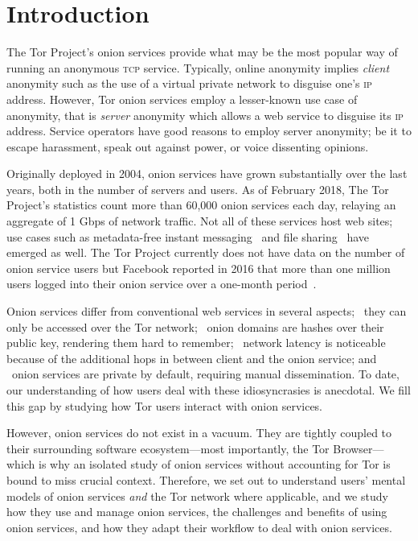 \section{Introduction}
\label{sec:introduction}
The Tor Project's onion services provide what may be the most popular way of
running an anonymous \textsc{tcp} service. Typically, online anonymity implies
\emph{client} anonymity such as the use of a virtual private network to disguise
one's \textsc{ip} address.  However, Tor onion services employ a lesser-known
use case of anonymity, that is \emph{server} anonymity which allows a web
service to disguise its \textsc{ip} address.  Service operators have good
reasons to employ server anonymity; be it to escape harassment, speak out
against power, or voice dissenting opinions.

Originally deployed in 2004, onion services have grown substantially over the
last years, both in the number of servers and users.  As of February 2018, The
Tor Project's statistics count more than 60,000 onion services each day,
relaying an aggregate of 1 Gbps of network traffic.  Not all of these services
host web sites; use cases such as metadata-free instant
messaging~\cite{ricochet} and file sharing~\cite{onionshare} have emerged as
well.  The Tor Project currently does not have data on the number of onion
service users but Facebook reported in 2016 that more than one million users
logged into their onion service over a one-month period~\cite{facebook-users}.

Onion services differ from conventional web services in several aspects;
\first~they can only be accessed over the Tor network; \second~onion domains are
hashes over their public key, rendering them hard to remember; \third~network
latency is noticeable because of the additional hops in between client and the
onion service; and \fourth~onion services are private by default, requiring
manual dissemination.  To date, our understanding of how users deal with these
idiosyncrasies is anecdotal.  We fill this gap by studying how Tor users
interact with onion services.

However, onion services do not exist in a vacuum.  They are tightly coupled to
their surrounding software ecosystem---most importantly, the Tor Browser---which
is why an isolated study of onion services without accounting for Tor is bound
to miss crucial context.  Therefore, we set out to understand users' mental
models of onion services \emph{and} the Tor network where applicable, and we
study how they use and manage onion services, the challenges and benefits of
using onion services, and how they adapt their workflow to deal with onion
services.

